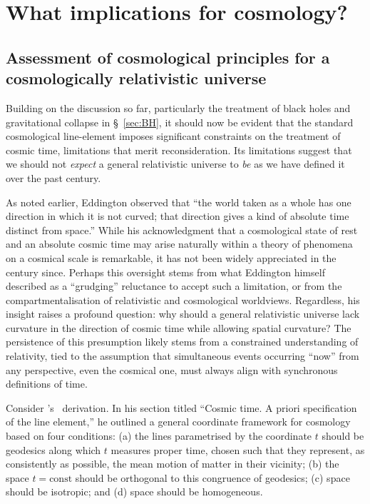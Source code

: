 \documentclass[aps,rmp,groupedaddress,twocolumn,10pt]{revtex4-2}
\begin{document}
\section{What implications for cosmology?}\label{sec:cosmology}

\subsection{Assessment of cosmological principles for a cosmologically relativistic universe}\label{sec:cosmo_analysis}

Building on the discussion so far, particularly the treatment of black holes and gravitational collapse in \S~\ref{sec:BH}, it should now be evident that the standard cosmological line-element imposes significant constraints on the treatment of cosmic time, limitations that merit reconsideration. Its limitations suggest that we should not \textit{expect} a general relativistic universe to \textit{be} as we have defined it over the past century.

As noted earlier, Eddington observed that ``the world taken as a whole has one direction in which it is not curved; that direction gives a kind of absolute time distinct from space.'' While his acknowledgment that a cosmological state of rest and an absolute cosmic time may arise naturally within a theory of phenomena on a cosmical scale is remarkable, it has not been widely appreciated in the century since. Perhaps this oversight stems from what Eddington himself described as a ``grudging'' reluctance to accept such a limitation, or from the compartmentalisation of relativistic and cosmological worldviews. Regardless, his insight raises a profound question: why should a general relativistic universe lack curvature in the direction of cosmic time while allowing spatial curvature? The persistence of this presumption likely stems from a constrained understanding of relativity, tied to the assumption that simultaneous events occurring ``now'' from any perspective, even the cosmical one, must always align with synchronous definitions of time.

Consider \citeauthor{Robertson1933}'s~\citeyearpar{Robertson1933} derivation. In his section titled ``Cosmic time. A priori specification of the line element,'' he outlined a general coordinate framework for cosmology based on four conditions: (a) the lines parametrised by the coordinate $t$ should be geodesics along which $t$ measures proper time, chosen such that they represent, as consistently as possible, the mean motion of matter in their vicinity; (b) the space $t = \mathrm{const}$ should be orthogonal to this congruence of geodesics; (c) space should be isotropic; and (d) space should be homogeneous.
\end{document}
